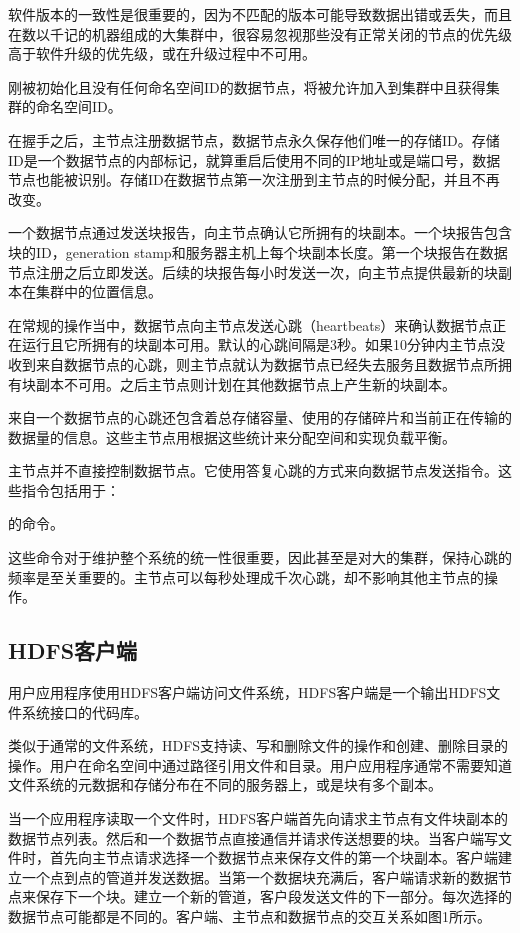 软件版本的一致性是很重要的，因为不匹配的版本可能导致数据出错或丢失，而且在数以千记的机器组成的大集群中，很容易忽视那些没有正常关闭的节点的优先级高于软件升级的优先级，或在升级过程中不可用。

刚被初始化且没有任何命名空间ID的数据节点，将被允许加入到集群中且获得集群的命名空间ID。

在握手之后，主节点注册数据节点，数据节点永久保存他们唯一的存储ID。存储ID是一个数据节点的内部标记，就算重启后使用不同的IP地址或是端口号，数据节点也能被识别。存储ID在数据节点第一次注册到主节点的时候分配，并且不再改变。

一个数据节点通过发送块报告，向主节点确认它所拥有的块副本。一个块报告包含块的ID，generation stamp和服务器主机上每个块副本长度。第一个块报告在数据节点注册之后立即发送。后续的块报告每小时发送一次，向主节点提供最新的块副本在集群中的位置信息。

在常规的操作当中，数据节点向主节点发送心跳（heartbeats）来确认数据节点正在运行且它所拥有的块副本可用。默认的心跳间隔是3秒。如果10分钟内主节点没收到来自数据节点的心跳，则主节点就认为数据节点已经失去服务且数据节点所拥有块副本不可用。之后主节点则计划在其他数据节点上产生新的块副本。

来自一个数据节点的心跳还包含着总存储容量、使用的存储碎片和当前正在传输的数据量的信息。这些主节点用根据这些统计来分配空间和实现负载平衡。

主节点并不直接控制数据节点。它使用答复心跳的方式来向数据节点发送指令。这些指令包括用于：
\begin{itemize}
\end{itemize}	
的命令。

这些命令对于维护整个系统的统一性很重要，因此甚至是对大的集群，保持心跳的频率是至关重要的。主节点可以每秒处理成千次心跳，却不影响其他主节点的操作。

\subsection{HDFS客户端}

用户应用程序使用HDFS客户端访问文件系统，HDFS客户端是一个输出HDFS文件系统接口的代码库。

类似于通常的文件系统，HDFS支持读、写和删除文件的操作和创建、删除目录的操作。用户在命名空间中通过路径引用文件和目录。用户应用程序通常不需要知道文件系统的元数据和存储分布在不同的服务器上，或是块有多个副本。

当一个应用程序读取一个文件时，HDFS客户端首先向请求主节点有文件块副本的数据节点列表。然后和一个数据节点直接通信并请求传送想要的块。当客户端写文件时，首先向主节点请求选择一个数据节点来保存文件的第一个块副本。客户端建立一个点到点的管道并发送数据。当第一个数据块充满后，客户端请求新的数据节点来保存下一个块。建立一个新的管道，客户段发送文件的下一部分。每次选择的数据节点可能都是不同的。客户端、主节点和数据节点的交互关系如图1所示。

